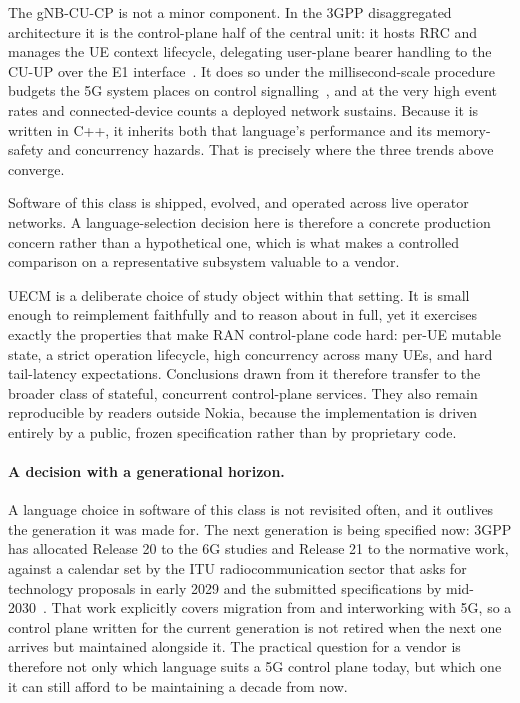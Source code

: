 \documentclass[english,twoside,openright,a4paper,censored,csm,software-track-2020]{HYthesisML}
\begin{document}
The gNB-CU-CP is not a minor component. In the 3GPP disaggregated architecture it is the
control-plane half of the central unit: it hosts RRC and manages the UE context lifecycle,
delegating user-plane bearer handling to the CU-UP over the E1
interface~\cite{3gpp38401,3gpp38300,3gpp38331,3gpp38463}. It does so under the
millisecond-scale procedure budgets the 5G system places on control
signalling~\cite{3gpp38913}, and at the very high event rates and connected-device counts a
deployed network sustains. Because it is written in C++, it inherits both that language's
performance and its memory-safety and concurrency hazards. That is precisely where the three
trends above converge.

Software of this class is shipped, evolved, and operated across live operator networks. A
language-selection decision here is therefore a concrete production concern rather than a
hypothetical one, which is what makes a controlled comparison on a representative subsystem
valuable to a vendor.

UECM is a deliberate choice of study object within that setting. It is small enough to
reimplement faithfully and to reason about in full, yet it exercises exactly the properties
that make RAN control-plane code hard: per-UE mutable state, a strict operation lifecycle,
high concurrency across many UEs, and hard tail-latency expectations. Conclusions drawn from
it therefore transfer to the broader class of stateful, concurrent control-plane services.
They also remain reproducible by readers outside Nokia, because the implementation is driven
entirely by a public, frozen specification rather than by proprietary code.

\paragraph{A decision with a generational horizon.}
A language choice in software of this class is not revisited often, and it outlives the
generation it was made for. The next generation is being specified now: 3GPP has allocated
Release 20 to the 6G studies and Release 21 to the normative work, against a calendar set by the
ITU radiocommunication sector that asks for technology proposals in early 2029 and the submitted
specifications by mid-2030~\cite{itu2023imt2030,3gpp2024road6g}. That work explicitly covers
migration from and interworking with 5G, so a control plane written for the current generation is
not retired when the next one arrives but maintained alongside it. The practical question for a
vendor is therefore not only which language suits a 5G control plane today, but which one it can
still afford to be maintaining a decade from now.
\end{document}
